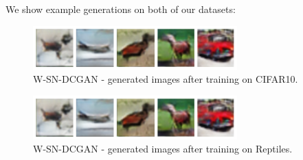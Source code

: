 We show example generations on both of our datasets:
\begin{figure}[H]
\centering
\includegraphics[width=0.7\textwidth]{../code/results/figures/images/w-sn-dcgan_cifar10}
\caption{W-SN-DCGAN - generated images after training on CIFAR10.}
\end{figure}

\begin{figure}[H]
\centering
\includegraphics[width=0.7\textwidth]{../code/results/figures/images/w-sn-dcgan_cifar10}
\caption{W-SN-DCGAN - generated images after training on Reptiles.}
\end{figure}